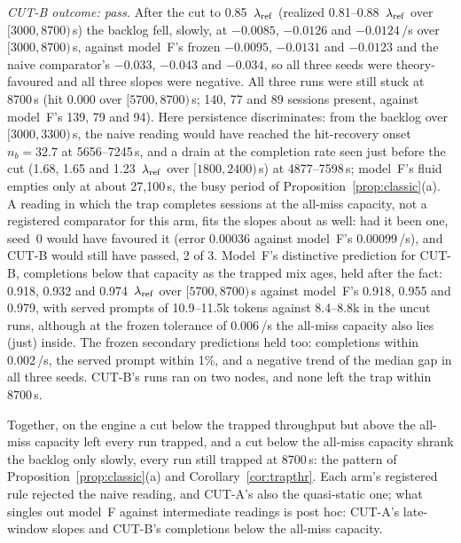 \begin{itemize}[leftmargin=*,nosep]
\emph{CUT-B outcome: pass.} After the cut to 0.85~$\lambda_{\mathrm{ref}}$ (realized 0.81--0.88~$\lambda_{\mathrm{ref}}$ over $[3000,8700)$\,s) the backlog
fell, slowly, at $-0.0085$, $-0.0126$ and $-0.0124$\,/s over $[3000,8700)$\,s, against model~F's frozen $-0.0095$, $-0.0131$
and $-0.0123$ and the naive comparator's $-0.033$, $-0.043$ and $-0.034$, so all three seeds were theory-favoured and all three
slopes were negative. All three runs were still stuck at 8700\,s (hit 0.000 over $[5700,8700)$\,s; 140, 77 and 89 sessions present,
against model~F's 139, 79 and 94). Here persistence discriminates: from the backlog over $[3000,3300)$\,s, the naive reading would
have reached the hit-recovery onset $n_b=32.7$ at 5656--7245\,s, and a drain at the completion rate seen just before the cut (1.68,
1.65 and 1.23~$\lambda_{\mathrm{ref}}$ over $[1800,2400)$\,s) at 4877--7598\,s; model~F's fluid empties only at about 27{,}100\,s, the busy period of
Proposition~\ref{prop:classic}(a). A reading in which the trap completes sessions at the all-miss capacity, not a registered comparator for
this arm, fits the slopes about as well: had it been one, seed~0 would have favoured it (error 0.00036 against model~F's
0.00099\,/s), and CUT-B would still have passed, 2 of 3. Model~F's distinctive prediction for CUT-B, completions below that capacity as the trapped
mix ages, held after the fact: 0.918, 0.932 and 0.974~$\lambda_{\mathrm{ref}}$ over $[5700,8700)$\,s against model~F's 0.918, 0.955 and 0.979, with
served prompts of 10.9--11.5k tokens against 8.4--8.8k in the uncut runs, although at the frozen tolerance of 0.006\,/s the
all-miss capacity also lies (just) inside. The frozen secondary predictions held too: completions within 0.002\,/s, the served
prompt within 1\%, and a negative trend of the median gap in all three seeds. CUT-B's runs ran on two nodes, and none left the trap within 8700\,s.

Together, on the engine a cut below the trapped throughput but above the all-miss capacity left every run trapped, and a cut below
the all-miss capacity shrank the backlog only slowly, every run still trapped at 8700\,s: the pattern of Proposition~\ref{prop:classic}(a) and Corollary~\ref{cor:trapthr}. Each
arm's registered rule rejected the naive reading, and CUT-A's also the quasi-static one; what singles out model~F against
intermediate readings is post hoc: CUT-A's late-window slopes and CUT-B's completions below the all-miss capacity.
\end{itemize}

